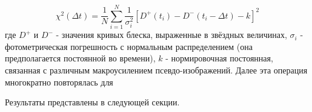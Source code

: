 \begin{equation}\label{chi2}
\chi^{2}(\Delta t)=\frac{1}{N} \sum_{i=1}^{N} \frac{1}{\sigma_{i}^{2}}\left[D^{+}\left(t_{i}\right)-D^{-}\left(t_{i}-\Delta t\right)-k\right]^{2}
\end{equation}
где $D^+$ и $D^-$ - значения кривых блеска, выраженные в звёздных величинах, $\sigma_i$ - фотометрическая погрешность с нормальным распределением (она предполагается постоянной во времени), $k$ - нормировочная постоянная, связанная с различным макроусилением псевдо-изображений. Далее эта операция многократно повторялась для 

Результаты представлены в следующей секции.
